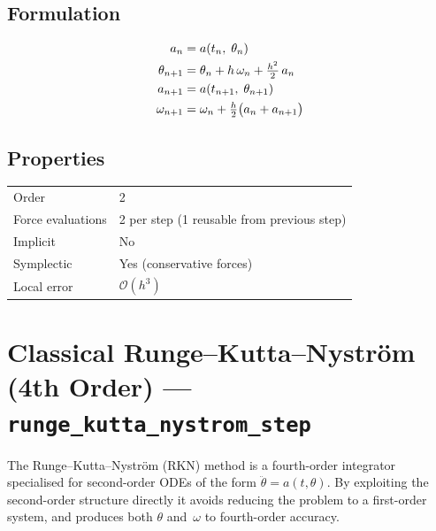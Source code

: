 \documentclass[11pt,a4paper]{article}
\newcommand{\bigO}{\mathcal{O}}
\begin{document}
\subsection{Formulation}
\begin{align}
  a_n         &= a(t_n,\;\theta_n) \notag\\
  \theta_{n+1} &= \theta_n + h\,\omega_n + \tfrac{h^2}{2}\,a_n \notag\\
  a_{n+1}     &= a(t_{n+1},\;\theta_{n+1}) \notag\\
  \omega_{n+1} &= \omega_n + \tfrac{h}{2}\bigl(a_n + a_{n+1}\bigr)
  \label{eq:vv}
\end{align}

\subsection{Properties}
\begin{center}
\begin{tabular}{ll}
  \hline
  Order             & 2 \\
  Force evaluations & 2 per step (1 reusable from previous step) \\
  Implicit          & No \\
  Symplectic        & Yes (conservative forces) \\
  Local error       & $\bigO(h^3)$ \\
  \hline
\end{tabular}
\end{center}

\section{Classical Runge--Kutta--Nystr\"{o}m (4th Order) --- \texttt{runge\_kutta\_nystrom\_step}}
\label{sec:rkn}

The Runge--Kutta--Nystr\"{o}m (RKN) method is a fourth-order integrator
specialised for second-order ODEs of the form $\ddot\theta = a(t,\theta)$. By
exploiting the second-order structure directly it avoids reducing the problem to
a first-order system, and produces both $\theta$ and~$\omega$ to fourth-order
accuracy.
\end{document}
